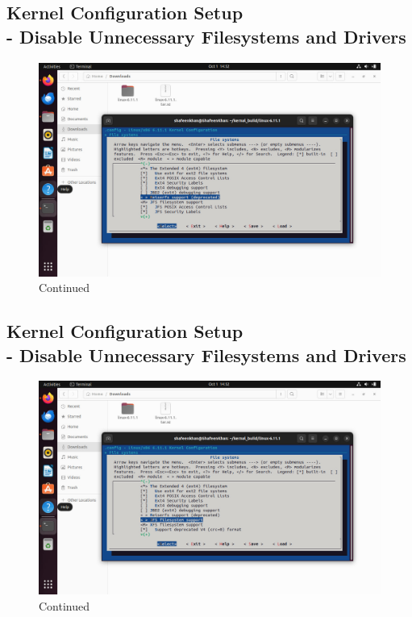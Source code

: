 \documentclass{article}
\begin{document}
\subsection{Kernel Configuration Setup \\-  Disable Unnecessary Filesystems and Drivers}
\begin{figure}[H]
    \centering
    \includegraphics[width=0.8\linewidth]{49.jpg}
    \caption{Continued}
\end{figure}

\subsection{Kernel Configuration Setup \\-  Disable Unnecessary Filesystems and Drivers}
\begin{figure}[H]
    \centering
    \includegraphics[width=0.8\linewidth]{48.jpg}
    \caption{Continued}
\end{figure}
\end{document}
